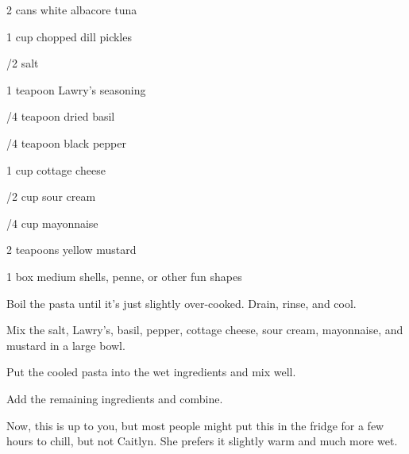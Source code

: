 \begin{IngredientsAndSteps}
    \ListIngredientsAndSteps
    {
        2 cans white albacore tuna

        1 cup chopped dill pickles

        /2 \tsp salt

        1 teapoon Lawry's seasoning

        /4 teapoon dried basil

        /4 teapoon black pepper

        1 cup cottage cheese

        /2 cup sour cream

        /4 cup mayonnaise

        2 teapoons yellow mustard

        1 box medium shells, penne, or other fun shapes
    }
    {
        Boil the pasta until it's just slightly over-cooked. Drain, rinse, and cool.

        Mix the salt, Lawry's, basil, pepper, cottage cheese, sour cream, mayonnaise, and mustard in
        a large bowl.

        Put the cooled pasta into the wet ingredients and mix well.

        Add the remaining ingredients and combine.

        Now, this is up to you, but most people might put this in the fridge for a few hours to chill,
        but not Caitlyn. She prefers it slightly warm and much more wet.
    }
\end{IngredientsAndSteps}

